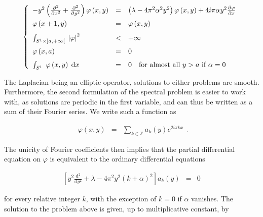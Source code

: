 \documentclass{jams-l}
\theoremstyle{definition}
\theoremstyle{remark}
\numberwithin{equation}{section}
\begin{document}
        \[ \left \{ \begin{array}{llll}
                - y^2 \left( \frac{\partial^2}{\partial x^2} + \frac{\partial^2}{\partial y^2} \right) \varphi \left( x, y \right) & = & \multicolumn{2}{l}{\left( \lambda - 4 \pi^2 \alpha^2 y^2 \right) \varphi \left( x, y \right) + 4 i \pi \alpha y^2 \frac{\partial \varphi}{\partial x}} \\[0.7em]
                
                \varphi \left( x+1, y \right) & = & \multicolumn{2}{l}{\varphi \left( x, y \right)} \\[0.7em]
                
                \int_{S^1 \times \left] a, +\infty \right[} \; \left \vert \varphi \right \vert^2 & < & \multicolumn{2}{l}{+ \infty} \\[0.7em]
                
                \varphi \left( x, a \right) & = & \multicolumn{2}{l}{0} \\[0.7em]
                
                \int_{S^1} \; \varphi \left( x, y \right) \; \mathrm{d}x & = & 0 &  \text{for almost all } y > a \text{ if } \alpha = 0
            \end{array} \right. \]
            
        The Laplacian being an elliptic operator, solutions to either problems are smooth. Furthermore, the second formulation of the spectral problem is easier to work with, as solutions are periodic in the first variable, and can thus be written as a sum of their Fourier series. We write such a function as
        
        \[ \begin{array}{lll}
                \varphi \left( x, y \right) & = & \sum\limits_{k \in \mathbb{Z}} a_k \left( y \right) e^{2 i \pi k x}
            \end{array} . \]
        
        The unicity of Fourier coefficients then implies that the partial differential equation on $\varphi$ is equivalent to the ordinary differential equations
        
        \[ \begin{array}{lll}
                \left[ y^2 \frac{\mathrm{d}^2}{\mathrm{d}y^2} + \lambda - 4 \pi^2 y^2 \left( k + \alpha \right)^2 \right] a_k \left( y \right) & = & 0
            \end{array} \]
        
        \noindent for every relative integer $k$, with the exception of $k = 0$ if $\alpha$ vanishes. The solution to the problem above is given, up to multiplicative constant, by
        
\end{document}
